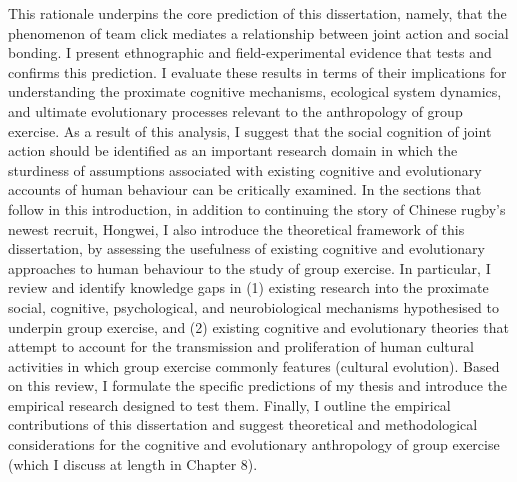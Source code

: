 This rationale underpins the core prediction of this dissertation, namely, that the phenomenon of team click mediates a relationship between joint action and social bonding.  I present ethnographic and field-experimental evidence that tests and confirms this prediction.  I evaluate these results in terms of their implications for understanding the proximate cognitive mechanisms, ecological system dynamics, and ultimate evolutionary processes relevant to the anthropology of group exercise.  As a result of this analysis, I suggest that the social cognition of joint action should be identified as an important research domain in which the sturdiness of assumptions associated with existing cognitive and evolutionary accounts of human behaviour can be critically examined.
In the sections that follow in this introduction, in addition to continuing the story of Chinese rugby's newest recruit, Hongwei, I also introduce the theoretical framework of this dissertation, by assessing the usefulness of existing cognitive and evolutionary approaches to human behaviour to the study of group exercise.  In particular, I review and identify knowledge gaps in (1) existing research into the proximate social, cognitive, psychological, and neurobiological mechanisms hypothesised to underpin group exercise, and (2) existing cognitive and evolutionary theories that attempt to account for the transmission and proliferation of human cultural activities in which group exercise commonly features (cultural evolution). Based on this review, I formulate the specific predictions of my thesis and introduce the empirical research designed to test them.  Finally, I outline the empirical contributions of this dissertation and suggest theoretical and methodological considerations for the cognitive and evolutionary anthropology of group exercise (which I discuss at length in Chapter 8).

